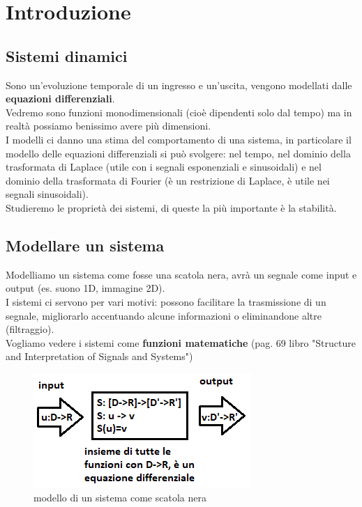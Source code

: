 \chapter{Introduzione}

\section{Sistemi dinamici}
Sono un'evoluzione temporale di un ingresso e un'uscita, vengono modellati dalle \textbf{equazioni differenziali}.\\
Vedremo sono funzioni monodimensionali (cioè dipendenti solo dal tempo) ma in realtà possiamo benissimo avere più dimensioni.\\
I modelli ci danno una stima del comportamento di una sistema, in particolare il modello delle equazioni differenziali si può svolgere: nel tempo, nel dominio della trasformata di Laplace (utile con i segnali esponenziali e sinusoidali) e nel dominio della trasformata di Fourier (è un restrizione di Laplace, è utile nei segnali sinusoidali).\\
Studieremo le proprietà dei sistemi, di queste la più importante è la stabilità.\\

\section{Modellare un sistema}
Modelliamo un sistema come fosse una scatola nera, avrà un segnale come input e output (es. suono 1D, immagine 2D).\\
I sistemi ci servono per vari motivi: possono facilitare la trasmissione di un segnale, migliorarlo accentuando alcune informazioni o eliminandone altre (filtraggio).\\
Vogliamo vedere i sistemi come \textbf{funzioni matematiche} (pag. 69 libro "Structure and Interpretation of Signals and Systems")\\

\begin{figure}
	\centering
	\includegraphics[width=0.7\linewidth]{immagini/sistema}
	\caption{ modello di un sistema come scatola nera}
	\label{fig:sistema}
\end{figure}



